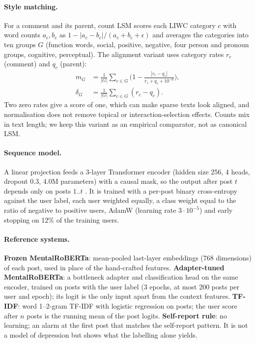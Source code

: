 \documentclass[11pt]{article}
\begin{document}
\paragraph{Style matching.}
For a comment and its parent, count LSM scores each LIWC category $c$ with word counts $a_c,b_c$ as $1-|a_c-b_c|/(a_c+b_c+\epsilon)$ and averages the categories into ten groups $G$ (function words, social, positive, negative, four person and pronoun groups, cognitive, perceptual).
The alignment variant uses category rates $r_c$ (comment) and $q_c$ (parent):
\begin{align*}
m_G &= \tfrac{1}{|G|}\textstyle\sum_{c\in G}\bigl(1-\tfrac{|r_c-q_c|}{r_c+q_c+10^{-6}}\bigr),\\
\delta_G &= \tfrac{1}{|G|}\textstyle\sum_{c\in G}(r_c-q_c).
\end{align*}
Two zero rates give a score of one, which can make sparse texts look aligned, and normalisation does not remove topical or interaction-selection effects.
Counts mix in text length; we keep this variant as an empirical comparator, not as canonical LSM.

\paragraph{Sequence model.}
A linear projection feeds a 3-layer Transformer encoder (hidden size 256, 4 heads, dropout 0.3, 4.0M parameters) with a causal mask, so the output after post $t$ depends only on posts $1..t$ \citep{vaswani2017attention}.
It is trained with a per-post binary cross-entropy against the user label, each user weighted equally, a class weight equal to the ratio of negative to positive users, AdamW \citep{loshchilov2017decoupled} (learning rate $3\cdot10^{-5}$) and early stopping on 12\% of the training users.

\paragraph{Reference systems.}
\textbf{Frozen MentalRoBERTa}: mean-pooled last-layer embeddings (768 dimensions) of each post, used in place of the hand-crafted features.
\textbf{Adapter-tuned MentalRoBERTa}: a bottleneck adapter and classification head on the same encoder, trained on posts with the user label (3 epochs, at most 200 posts per user and epoch); its logit is the only input apart from the context features.
\textbf{TF-IDF}: word 1--2-gram TF-IDF with logistic regression on posts; the user score after $n$ posts is the running mean of the post logits.
\textbf{Self-report rule}: no learning; an alarm at the first post that matches the self-report pattern.
It is not a model of depression but shows what the labelling alone yields.
\end{document}
